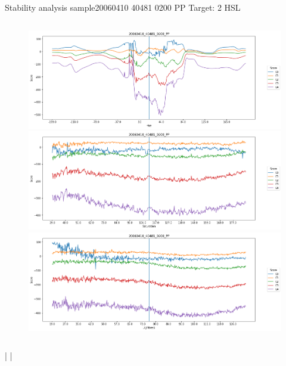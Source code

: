\documentclass{beamer}
\begin{document}
\begin{frame}{Stability analysis sample}{20060410 40481 0200 PP Target: 2 HSL}
\begin{columns}
\begin{column}{0.45\textwidth}
\begin{figure}[p]
\includegraphics[width=\textwidth]{chapter_stability/20060410_40481_0200_PP/h/scores.png}			\includegraphics[width=\textwidth]{chapter_stability/20060410_40481_0200_PP/s/scores.png}			\includegraphics[width=\textwidth]{chapter_stability/20060410_40481_0200_PP/l/scores.png}
\end{figure}
\end{column}
\end{columns}
\href{run:videos_stability/Messidor_20060410_40481_0200_PP_Target_2_Checking_Hue_Sensitivity.mp4}{\color{blue}{Hue}} | \href{run:videos_stability/Messidor_20060410_40481_0200_PP_Target_2_Checking_Saturation_Sensitivity.mp4}{\color{blue}{Saturation}} | \href{run:videos_stability/Messidor_20060410_40481_0200_PP_Target_2_Checking_Luminance_Sensitivity.mp4}{\color{blue}{Lightness}}
\end{frame}
\end{document}
